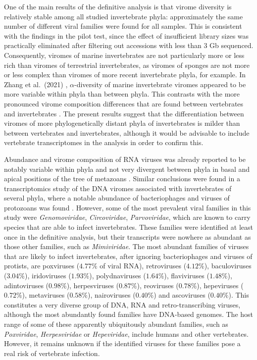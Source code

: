 \documentclass[
  openany]{book}
\begin{document}
One of the main results of the definitive analysis is that virome diversity is relatively stable among all studied invertebrate phyla: approximately the same number of different viral families were found for all samples. This is consistent with the findings in the pilot test, since the effect of insufficient library sizes was practically eliminated after filtering out accessions with less than 3 Gb sequenced. Consequently, viromes of marine invertebrates are not particularly more or less rich than viromes of terrestrial invertebrates, as viromes of sponges are not more or less complex than viromes of more recent invertebrate phyla, for example. In Zhang et al.~(2021) \autocite{Zhang2021}, \(\alpha\)-diversity of marine invertebrate viromes appeared to be more variable within phyla than between phyla. This contrasts with the more pronounced virome composition differences that are found between vertebrates and invertebrates \autocite{Mahar2020}. The present results suggest that the differentiation between viromes of more phylogenetically distant phyla of invertebrates is milder than between vertebrates and invertebrates, although it would be advisable to include vertebrate transcriptomes in the analysis in order to confirm this.

Abundance and virome composition of RNA viruses was already reported to be notably variable within phyla and not very divergent between phyla in basal and apical positions of the tree of metazoans \autocite{Shi2016}. Similar conclusions were found in a transcriptomics study of the DNA viromes associated with invertebrates of several phyla, where a notable abundance of bacteriophages and viruses of protozoans was found \autocite{Porter2019}. However, some of the most prevalent viral families in this study were \emph{Genomoviridae}, \emph{Circoviridae}, \emph{Parvoviridae}, which are known to carry species that are able to infect invertebrates. These families were identified at least once in the definitive analysis, but their transcripts were nowhere as abundant as those other families, such as \emph{Mimiviridae}. The most abundant families of viruses that are likely to infect invertebrates, after ignoring bacteriophages and viruses of protists, are poxviruses (\(4.77\%\) of viral RNA), retroviruses (\(4.12\%\)), baculoviruses (\(3.04\%\)), iridoviruses (\(1.93\%\)), polydnaviruses (\(1.64\%\)), flaviviruses (\(1.48\%\)), adintoviruses (\(0.98\%\)), herpesviruses (\(0.87\%\)), reoviruses (\(0.78\%\)), hepeviruses (\(0.72\%\)), metaviruses (\(0.58\%\)), nairoviruses (\(0.40\%\)) and ascoviruses (\(0.40\%\)). This constitutes a very diverse group of DNA, RNA and retro-transcribing viruses, although the most abundantly found families have DNA-based genomes. The host range of some of these apparently ubiquitously abundant families, such as \emph{Poxviridae}, \emph{Herpesviridae} or \emph{Hepeviridae}, include humans and other vertebrates. However, it remains unknown if the identified viruses for these families pose a real risk of vertebrate infection.
\end{document}

